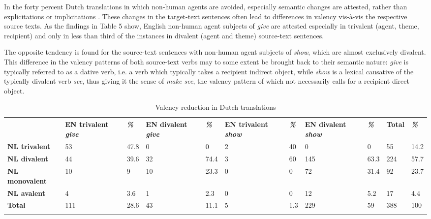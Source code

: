 \documentclass[output=paper]{LSP/langsci}
\begin{document}
In the forty percent Dutch translations in which non-human agents are avoided, especially semantic changes are attested, rather than explicitations or implicitations \citep[see][section 2]{Vandepitte2007}. These changes in the target-text sentences often lead to differences in valency vis-à-vis the respective source texts. As the findings in Table 5 show, English non-human agent subjects of \textit{give} are attested especially in trivalent (agent, theme, recipient) and only in less than third of the instances in divalent (agent and theme) source-text sentences. 	

The opposite tendency is found for the source-text sentences with non-human agent subjects of \textit{show}, which are almost exclusively divalent. This difference in the valency patterns of both source-text verbs may to some extent be brought back to their semantic nature: \textit{give} is typically referred to as a dative verb, i.e. a verb which typically takes a recipient indirect object, while \textit{show} is a lexical causative of the typically divalent verb \textit{see}, thus giving it the sense of \textit{make see}, the valency pattern of which not necessarily calls for a recipient direct object.

\begin{table}
     \centering
     \begin{tabular}{lllllllllll}
     \lsptoprule
     &  EN trivalent \textit{give}   & \textit{\%}  & EN divalent \textit{give} & \textit{\%} & EN trivalent \textit{show} & \textit{\%} & EN divalent \textit{show} & \textit{\%} & Total & \textit{\%} \\ \midrule
       \textbf{NL trivalent}  & 53    & 47.8      & 0	    & 0      & 2   & 40   &0    & 0    & 55  & 14.2 \\
       \textbf{NL divalent}   & 44    & 39.6      & 32      & 74.4   & 3   & 60   & 145 & 63.3 & 224 & 57.7 \\
       \textbf{NL monovalent} & 10    & 9         & 10      & 23.3   & 0   & 0    & 72  & 31.4 & 92  & 23.7 \\  
      \textbf{NL avalent}     & 4     & 3.6       & 1       & 2.3    & 0   & 0    & 12  & 5.2  & 17  & 4.4  \\ \midrule
       \textbf{Total}         & 111   & 28.6      & 43      & 11.1   & 5   & 1.3  & 229 & 59   & 388 & 100  \\ 
\lspbottomrule       
     \end{tabular}
 
     \caption{Valency reduction in Dutch translations}
     \label{5.5}
 
   \end{table}
\end{document}
